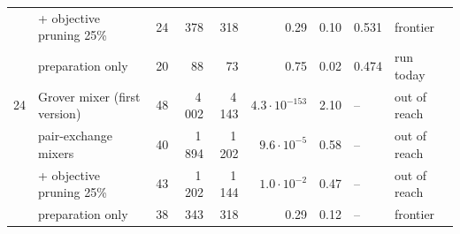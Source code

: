 \begin{table}[t]
\begin{tabular}{llrrrrrll}
 & \quad + objective pruning 25\% & 24 & 378 & 318 & 0.29 & 0.10 & 0.531 & frontier\\
 & preparation only & 20 & 88 & 73 & 0.75 & 0.02 & 0.474 & run today\\
\midrule
24 & Grover mixer (first version) & 48 & 4\,002 & 4\,143 & $4.3\!\cdot\!10^{-153}$ & 2.10 & -- & out of reach\\
 & pair-exchange mixers & 40 & 1\,894 & 1\,202 & $9.6\!\cdot\!10^{-5}$ & 0.58 & -- & out of reach\\
 & \quad + objective pruning 25\% & 43 & 1\,202 & 1\,144 & $1.0\!\cdot\!10^{-2}$ & 0.47 & -- & out of reach\\
 & preparation only & 38 & 343 & 318 & 0.29 & 0.12 & -- & frontier\\
\bottomrule
\end{tabular}
\end{table}
